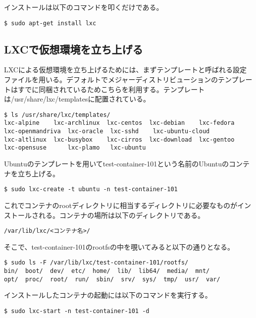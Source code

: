\documentclass[9pt,b5paper,tombo]{jsbook}
\begin{document}
\noindent
インストールは以下のコマンドを叩くだけである。

\begin{lstlisting}
$ sudo apt-get install lxc
\end{lstlisting}

\subsection{LXCで仮想環境を立ち上げる}
LXCによる仮想環境を立ち上げるためには、まずテンプレートと呼ばれる設定ファイルを用いる。デフォルトでメジャーディストリビューションのテンプレートはすでに同梱されているためこちらを利用する。テンプレートは/usr/share/lxc/templatesに配置されている。

\begin{lstlisting}
$ ls /usr/share/lxc/templates/
lxc-alpine    lxc-archlinux  lxc-centos  lxc-debian    lxc-fedora  lxc-openmandriva  lxc-oracle  lxc-sshd    lxc-ubuntu-cloud
lxc-altlinux  lxc-busybox    lxc-cirros  lxc-download  lxc-gentoo  lxc-opensuse      lxc-plamo	 lxc-ubuntu
\end{lstlisting}

\noindent
Ubuntuのテンプレートを用いてtest-container-101という名前のUbuntuのコンテナを立ち上げる。

\begin{lstlisting}
$ sudo lxc-create -t ubuntu -n test-container-101
\end{lstlisting}

\noindent
これでコンテナのrootディレクトリに相当するディレクトリに必要なものがインストールされる。コンテナの場所は以下のディレクトリである。

\begin{lstlisting}
/var/lib/lxc/<コンテナ名>/
\end{lstlisting}

\noindent
そこで、test-container-101のrootfsの中を覗いてみると以下の通りとなる。

\begin{lstlisting}
$ sudo ls -F /var/lib/lxc/test-container-101/rootfs/
bin/  boot/  dev/  etc/  home/	lib/  lib64/  media/  mnt/
opt/  proc/  root/	run/  sbin/  srv/  sys/  tmp/  usr/  var/
\end{lstlisting}

\noindent
インストールしたコンテナの起動には以下のコマンドを実行する。

\begin{lstlisting}
$ sudo lxc-start -n test-container-101 -d
\end{lstlisting}
\end{document}
